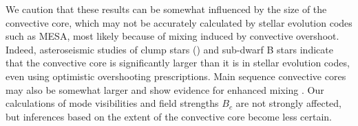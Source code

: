 We caution that these results can be somewhat influenced by the size of the convective core, which may not be accurately calculated by stellar evolution codes such as MESA, most likely because of mixing induced by convective overshoot. Indeed, asteroseismic studies of clump stars (\cite{montalban_2013,stello_2013,mosser_2014,bossini_2015,constantino_2015}) and sub-dwarf B stars \citep{vangrootel_2010a,vangrootel_2010b,charpinet_2011,Schindler_2015} indicate that the convective core is significantly larger than it is in stellar evolution codes, even using optimistic overshooting prescriptions. Main sequence convective cores may also be somewhat larger and show evidence for enhanced mixing \citep{moravveji_2015}.  Our calculations of mode visibilities and field strengths $B_c$ are not strongly affected, but inferences based on the extent of the convective core become less certain.
    
    